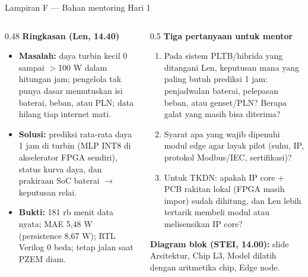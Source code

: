 \documentclass[aspectratio=169, 10pt]{beamer}
\begin{document}
\begin{frame}{Lampiran F --- Bahan mentoring Hari 1}
\begin{columns}[T]
\begin{column}{0.48\linewidth}
\small\textbf{Ringkasan (Len, 14.40)}
\begin{itemize}\scriptsize
  \item \textbf{Masalah:} daya turbin kecil 0 sampai $>$100 W dalam hitungan jam; pengelola tak punya dasar memutuskan isi baterai, beban, atau PLN; data hilang tiap internet mati.
  \item \textbf{Solusi:} prediksi rata-rata daya 1 jam di turbin (MLP INT8 di akselerator FPGA sendiri), status kurva daya, dan prakiraan SoC baterai $\to$ keputusan relai.
  \item \textbf{Bukti:} 181 rb menit data nyata; MAE 5,48 W (persistence 8,67 W); RTL Verilog 0 beda; tetap jalan saat PZEM diam.
\end{itemize}
\end{column}
\begin{column}{0.5\linewidth}
\small\textbf{Tiga pertanyaan untuk mentor}
\begin{enumerate}\scriptsize
  \item Pada sistem PLTB/hibrida yang ditangani Len, keputusan mana yang paling butuh prediksi 1 jam: penjadwalan baterai, pelepasan beban, atau genset/PLN? Berapa galat yang masih bisa diterima?
  \item Syarat apa yang wajib dipenuhi modul edge agar layak pilot (suhu, IP, protokol Modbus/IEC, sertifikasi)?
  \item Untuk TKDN: apakah IP core + PCB rakitan lokal (FPGA masih impor) sudah dihitung, dan Len lebih tertarik membeli modul atau melisensikan IP core?
\end{enumerate}
\small\textbf{Diagram blok (STEI, 14.00):} slide Arsitektur, Chip L3, Model dilatih dengan aritmetika chip, Edge node.
\end{column}
\end{columns}
\end{frame}
\end{document}
